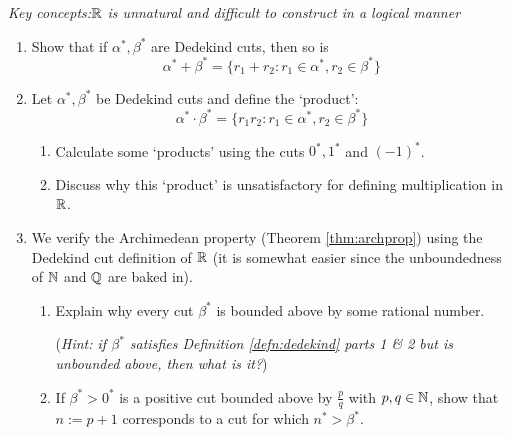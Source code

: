\begin{exercises}{}{}
	\emph{Key concepts:\quad $\mathbb{R}$ is unnatural and difficult to construct in a logical manner}

	\begin{enumerate}
	  \item Show that if $\alpha^*,\beta^*$ are Dedekind cuts, then so is
  	\[
  		\alpha^*+\beta^*=\{r_1+r_2:r_1\in\alpha^*,r_2\in\beta^*\}
  	\]
	  
	  
	  \item %
	  Let $\alpha^*,\beta^*$ be Dedekind cuts and define the `product':
	  \[
	  	\alpha^*\cdot\beta^*=\{r_1r_2:r_1\in\alpha^*,r_2\in\beta^*\}
	  \]
	  \begin{enumerate}
	  	\item Calculate some `products' using the cuts $0^*,1^*$ and $(-1)^*$.
	  	\item Discuss why this `product' is unsatisfactory for defining multiplication in $\mathbb{R}$.
	  \end{enumerate}
	  
	  
	  \item We verify the Archimedean property (Theorem \ref{thm:archprop}) using the Dedekind cut definition of $\mathbb{R}$ (it is somewhat easier since the unboundedness of $\mathbb{N}$ and $\mathbb{Q}$ are baked in).
	  \begin{enumerate}
	    \item Explain why every cut $\beta^*$ is bounded above by some rational number.\par
	    (\emph{Hint: if $\beta^*$ satisfies Definition \ref{defn:dedekind} parts 1 \& 2 but is unbounded above, then what is it?})
	    \item If $\beta^*>0^*$ is a positive cut bounded above by $\frac pq$ with $p,q\in\mathbb{N}$, show that $n:=p+1$ corresponds to a cut for which $n^*>\beta^*$.
		\end{enumerate}
	\end{enumerate}
\end{exercises}